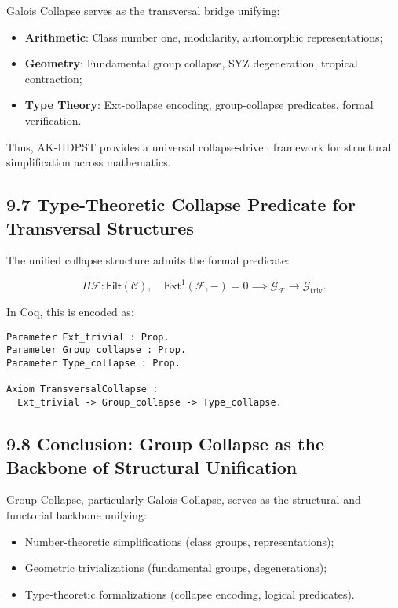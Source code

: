 \documentclass[11pt]{article}
\begin{document}
Galois Collapse serves as the transversal bridge unifying:

\begin{itemize}
    \item \textbf{Arithmetic}: Class number one, modularity, automorphic representations;
    \item \textbf{Geometry}: Fundamental group collapse, SYZ degeneration, tropical contraction;
    \item \textbf{Type Theory}: Ext-collapse encoding, group-collapse predicates, formal verification.
\end{itemize}

Thus, AK-HDPST provides a universal collapse-driven framework for structural simplification across mathematics.

\subsection*{9.7 Type-Theoretic Collapse Predicate for Transversal Structures}

The unified collapse structure admits the formal predicate:

\[
\Pi \mathcal{F} : \mathsf{Filt}(\mathcal{C}), \quad \mathrm{Ext}^1(\mathcal{F}, -) = 0 \implies \mathcal{G}_{\mathcal{F}} \longrightarrow \mathcal{G}_{\mathrm{triv}}.
\]

In Coq, this is encoded as:

\begin{lstlisting}[language=Coq]
Parameter Ext_trivial : Prop.
Parameter Group_collapse : Prop.
Parameter Type_collapse : Prop.

Axiom TransversalCollapse :
  Ext_trivial -> Group_collapse -> Type_collapse.
\end{lstlisting}

\subsection*{9.8 Conclusion: Group Collapse as the Backbone of Structural Unification}

Group Collapse, particularly Galois Collapse, serves as the structural and functorial backbone unifying:

\begin{itemize}
    \item Number-theoretic simplifications (class groups, representations);
    \item Geometric trivializations (fundamental groups, degenerations);
    \item Type-theoretic formalizations (collapse encoding, logical predicates).
\end{itemize}
\end{document}
